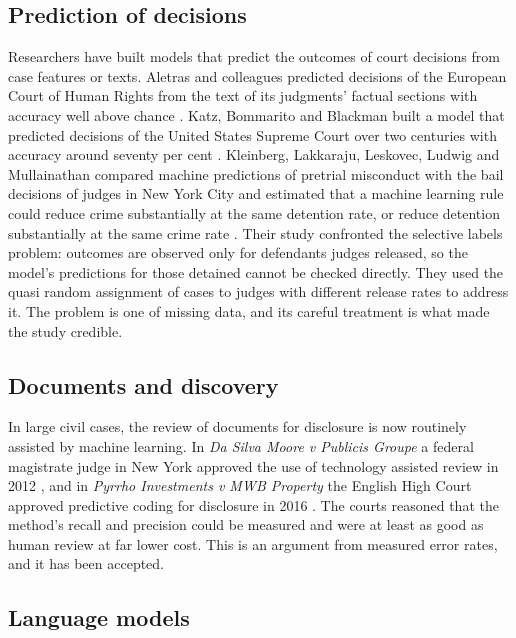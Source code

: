 \subsection{Prediction of decisions}

Researchers have built models that predict the outcomes of court decisions from case features or texts. Aletras and colleagues predicted decisions of the European Court of Human Rights from the text of its judgments' factual sections with accuracy well above chance \citep{aletras2016}. Katz, Bommarito and Blackman built a model that predicted decisions of the United States Supreme Court over two centuries with accuracy around seventy per cent \citep{katz2017}. Kleinberg, Lakkaraju, Leskovec, Ludwig and Mullainathan compared machine predictions of pretrial misconduct with the bail decisions of judges in New York City and estimated that a machine learning rule could reduce crime substantially at the same detention rate, or reduce detention substantially at the same crime rate \citep{kleinberg2018}. Their study confronted the selective labels problem: outcomes are observed only for defendants judges released, so the model's predictions for those detained cannot be checked directly. They used the quasi random assignment of cases to judges with different release rates to address it. The problem is one of missing data, and its careful treatment is what made the study credible.

\subsection{Documents and discovery}

In large civil cases, the review of documents for disclosure is now routinely assisted by machine learning. In \emph{Da Silva Moore v Publicis Groupe} a federal magistrate judge in New York approved the use of technology assisted review in 2012 \citep{dasilva2012}, and in \emph{Pyrrho Investments v MWB Property} the English High Court approved predictive coding for disclosure in 2016 \citep{pyrrho2016}. The courts reasoned that the method's recall and precision could be measured and were at least as good as human review at far lower cost. This is an argument from measured error rates, and it has been accepted.

\subsection{Language models}

